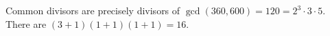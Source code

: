 Common divisors are precisely divisors of $\gcd(360,600)=120=2^3\cdot3\cdot5$. There are $(3+1)(1+1)(1+1)=\boxed{16}$.
